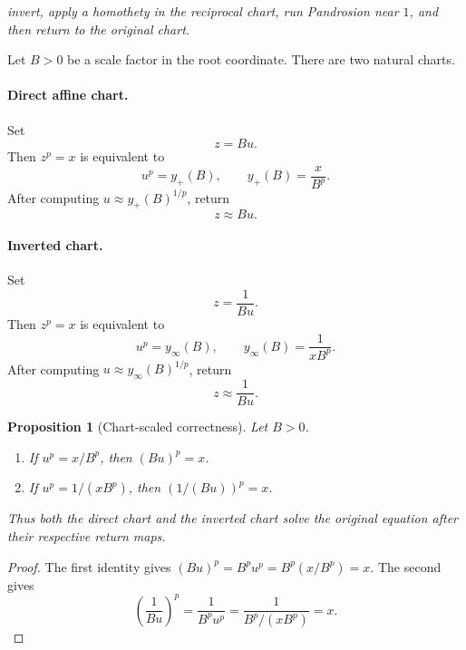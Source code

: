 \documentclass[10pt,a4paper]{article}
\theoremstyle{plain}
\newtheorem{proposition}[theorem]{Proposition}
\theoremstyle{definition}
\theoremstyle{remark}
\begin{document}
\begin{center}
\emph{invert, apply a homothety in the reciprocal chart, run Pandrosion near
$1$, and then return to the original chart.}
\end{center}

Let $B>0$ be a scale factor in the root coordinate.  There are two natural
charts.

\paragraph{Direct affine chart.}
Set
\[
  z=B u.
\]
Then $z^p=x$ is equivalent to
\begin{equation}
  u^p=y_+(B),
  \qquad
  y_+(B)=\frac{x}{B^p}.
  \label{eq:direct-chart-target}
\end{equation}
After computing $u\approx y_+(B)^{1/p}$, return
\[
  z\approx B u.
\]

\paragraph{Inverted chart.}
Set
\[
  z=\frac{1}{B u}.
\]
Then $z^p=x$ is equivalent to
\begin{equation}
  u^p=y_\infty(B),
  \qquad
  y_\infty(B)=\frac{1}{xB^p}.
  \label{eq:inverted-chart-target}
\end{equation}
After computing $u\approx y_\infty(B)^{1/p}$, return
\[
  z\approx \frac{1}{B u}.
\]

\begin{proposition}[Chart-scaled correctness]
Let $B>0$.
\begin{enumerate}
  \item If $u^p=x/B^p$, then $(Bu)^p=x$.
  \item If $u^p=1/(xB^p)$, then $(1/(Bu))^p=x$.
\end{enumerate}
Thus both the direct chart and the inverted chart solve the original equation
after their respective return maps.
\end{proposition}

\begin{proof}
The first identity gives $(Bu)^p=B^p u^p=B^p(x/B^p)=x$.  The second gives
\[
  \left(\frac{1}{Bu}\right)^p
  =\frac{1}{B^p u^p}
  =\frac{1}{B^p/(xB^p)}=x.
\]
\end{proof}
\end{document}
